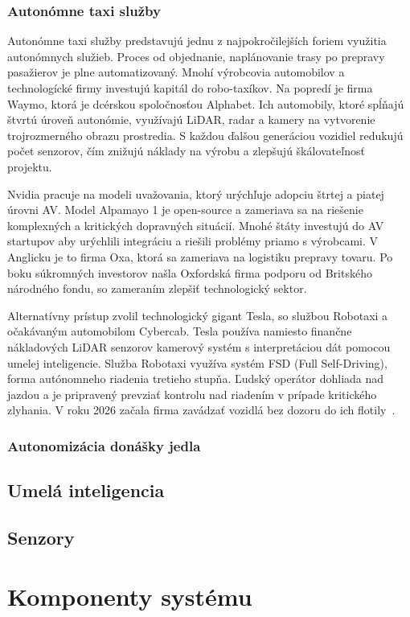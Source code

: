 \subsubsection{Autonómne taxi služby}
Autonómne taxi služby predstavujú jednu z najpokročilejších foriem využitia autonómnych služieb. Proces od objednanie, naplánovanie trasy po prepravy pasažierov je plne automatizovaný. Mnohí výrobcovia automobilov a technologícké firmy investujú kapitál do robo-taxíkov. Na popredí je firma Waymo, ktorá je dcérskou spoločnosťou Alphabet. Ich automobily, ktoré spĺňajú štvrtú úroveň autonómie, využívajú LiDAR, radar a kamery na vytvorenie trojrozmerného obrazu prostredia. S každou ďalšou generáciou vozidiel redukujú počet senzorov, čím znižujú náklady na výrobu a zlepšujú škálovateľnosť projektu.\par
Nvidia pracuje na modeli uvažovania, ktorý urýchľuje adopciu štrtej a piatej úrovni AV. Model Alpamayo 1 je open-source a zameriava sa na riešenie komplexných a kritických dopravných situácií. Mnohé štáty investujú do AV startupov aby urýchlili integráciu a riešili problémy priamo s výrobcami. V Anglicku je to firma Oxa, ktorá sa zameriava na logistiku prepravy tovaru. Po boku súkromných investorov našla Oxfordská firma podporu od Britského národného fondu, so zameraním zlepšiť technologický sektor.\par
Alternatívny prístup zvolil technologický gigant Tesla, so službou Robotaxi a očakávaným automobilom Cybercab. Tesla používa namiesto finančne nákladových LiDAR senzorov kamerový systém s interpretáciou dát pomocou umelej inteligencie. Služba Robotaxi využíva systém FSD (Full Self-Driving), forma autónomneho riadenia tretieho stupňa. Ľudský operátor dohliada nad jazdou a je pripravený prevziať kontrolu nad riadením v prípade kritického zlyhania. V roku 2026 začala firma zavádzať vozidlá bez dozoru do ich flotily~\cite{notateslaapp2026}.
\subsubsection{Autonomizácia donášky jedla}
\subsection{Umelá inteligencia}
\subsection{Senzory}

\section{Komponenty systému}\label{sec:Komponenty}
